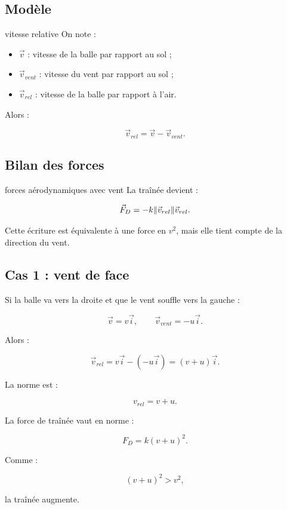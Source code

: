 \documentclass[11pt,a4paper]{article}
\begin{document}
\subsection{Modèle}

\begin{modele}{vitesse relative}
On note :
\begin{itemize}
    \item $\vec{v}$ : vitesse de la balle par rapport au sol ;
    \item $\vec{v}_{vent}$ : vitesse du vent par rapport au sol ;
    \item $\vec{v}_{rel}$ : vitesse de la balle par rapport à l'air.
\end{itemize}

Alors :

\[
\vec{v}_{rel}=\vec{v}-\vec{v}_{vent}.
\]
\end{modele}

\subsection{Bilan des forces}

\begin{bilan}{forces aérodynamiques avec vent}
La traînée devient :

\[
\vec{F}_D=-k\norm{\vec{v}_{rel}}\vec{v}_{rel}.
\]

Cette écriture est équivalente à une force en $v^2$, mais elle tient compte de la direction du vent.
\end{bilan}

\subsection{Cas 1 : vent de face}

Si la balle va vers la droite et que le vent souffle vers la gauche :

\[
\vec{v}=v\vec{i},
\qquad
\vec{v}_{vent}=-u\vec{i}.
\]

Alors :

\[
\vec{v}_{rel}=v\vec{i}-(-u\vec{i})=(v+u)\vec{i}.
\]

La norme est :

\[
v_{rel}=v+u.
\]

La force de traînée vaut en norme :

\[
F_D=k(v+u)^2.
\]

Comme :

\[
(v+u)^2>v^2,
\]

la traînée augmente.
\end{document}
